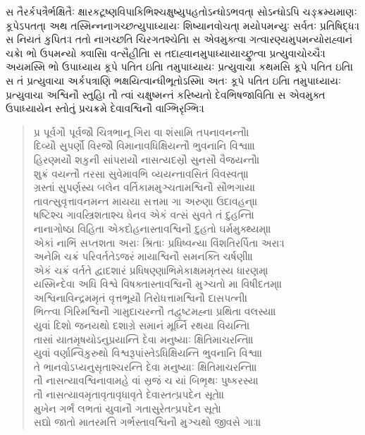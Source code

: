 \documentclass[a4paper,12pt]{article}
\begin{document}
સ તૈરર્કપત્રૈર્ભક્ષિતૈઃ ક્ષારકટૂષ્ણવિપાકિભિશ્ચક્ષુષ્યુપહતોઽન્ધોઽભવત્। સોઽન્ધોઽપિ ચઙ્ક્રમ્યમાણઃ કૂપેઽપતત્।
અથ તસ્મિન્નનાગચ્છત્યુપાધ્યાયઃ શિષ્યાનવોચત્। મયોપમન્યુઃ સર્વતઃ પ્રતિષિદ્ધઃ। સ નિયતં કુપિતઃ। તતો નાગચ્છતિ ચિરગતશ્ચેતિ।
સ એવમુક્ત્વા ગત્વારણ્યમુપમન્યોરાહ્વાનં ચક્રે। ભો ઉપમન્યો ક્વાસિ। વત્સૈહીતિ।
સ તદાહ્વાનમુપાધ્યાયાચ્છ્રુત્વા પ્રત્યુવાચોચ્ચૈઃ। અયમસ્મિ ભો ઉપાધ્યાય કૂપે પતિત ઇતિ।
તમુપાધ્યાયઃ પ્રત્યુવાચ। કથમસિ કૂપે પતિત ઇતિ।
સ તં પ્રત્યુવાચ। અર્કપત્રાણિ ભક્ષયિત્વાન્ધીભૂતોઽસ્મિ। અતઃ કૂપે પતિત ઇતિ।
તમુપાધ્યાયઃ પ્રત્યુવાચ। અશ્વિનૌ સ્તુહિ। તૌ ત્વાં ચક્ષુષ્મન્તં કરિષ્યતો દેવભિષજાવિતિ।
સ એવમુક્ત ઉપાધ્યાયેન સ્તોતું પ્રચક્રમે દેવાવશ્વિનૌ વાગ્ભિરૃગ્ભિઃ।
\begin{verse}
પ્ર પૂર્વગૌ પૂર્વજૌ ચિત્રભાનૂ ગિરા વા શંસામિ તપનાવનન્તૌ। \\
દિવ્યૌ સુપર્ણૌ વિરજૌ વિમાનાવધિક્ષિયન્તૌ ભુવનાનિ વિશ્વા॥ \\
હિરણ્મયૌ શકુની સાંપરાયૌ નાસત્યદસ્રૌ સુનસૌ વૈજયન્તૌ। \\
શુક્રં વયન્તૌ તરસા સુવેમાવભિ વ્યયન્તાવસિતં વિવસ્વત્॥ \\
ગ્રસ્તાં સુપર્ણસ્ય બલેન વર્તિકામમુઞ્ચતામશ્વિનૌ સૌભગાય। \\
તાવત્સુવૃત્તાવનમન્ત માયયા સત્તમા ગા અરુણા ઉદાવહન્॥ \\
ષષ્ટિશ્ચ ગાવસ્ત્રિશતાશ્ચ ધેનવ એકં વત્સં સુવતે તં દુહન્તિ। \\
નાનાગોષ્ઠા વિહિતા એકદોહનાસ્તાવશ્વિનૌ દુહતો ઘર્મમુક્થ્યમ્॥ \\
એકાં નાભિં સપ્તશતા અરાઃ શ્રિતાઃ પ્રધિષ્વન્યા વિંશતિરર્પિતા અરાઃ। \\
અનેમિ ચક્રં પરિવર્તતેઽજરં માયાશ્વિનૌ સમનક્તિ ચર્ષણી॥ \\
એકં ચક્રં વર્તતે દ્વાદશારં પ્રધિષણ્ણાભિમેકાક્ષમમૃતસ્ય ધારણમ્। \\
યસ્મિન્દેવા અધિ વિશ્વે વિષક્તાસ્તાવશ્વિનૌ મુઞ્ચતો મા વિષીદતમ્॥ \\
અશ્વિનાવિન્દ્રમમૃતં વૃત્તભૂયૌ તિરોધત્તામશ્વિનૌ દાસપત્ની। \\
ભિત્ત્વા ગિરિમશ્વિનૌ ગામુદાચરન્તૌ તદ્વૃષ્ટમહ્ના પ્રથિતા વલસ્ય॥ \\
યુવાં દિશો જનયથો દશાગ્રે સમાનં મૂર્ધ્નિ રથયા વિયન્તિ। \\
તાસાં યાતમૃષયોઽનુપ્રયાન્તિ દેવા મનુષ્યાઃ ક્ષિતિમાચરન્તિ॥ \\
યુવાં વર્ણાન્વિકુરુથો વિશ્વરૂપાંસ્તેઽધિક્ષિયન્તિ ભુવનાનિ વિશ્વા। \\
તે ભાનવોઽપ્યનુસૃતાશ્ચરન્તિ દેવા મનુષ્યાઃ ક્ષિતિમાચરન્તિ॥ \\
તૌ નાસત્યાવશ્વિનાવામહે વાં સ્રજં ચ યાં બિભૃથઃ પુષ્કરસ્ય। \\
તૌ નાસત્યાવમૃતાવૃતાવૃધાવૃતે દેવાસ્તત્પ્રપદેન સૂતે॥ \\
મુખેન ગર્ભં લભતાં યુવાનૌ ગતાસુરેતત્પ્રપદેન સૂતે। \\
સદ્યો જાતો માતરમત્તિ ગર્ભસ્તાવશ્વિનૌ મુઞ્ચથો જીવસે ગાઃ॥ \\
\end{verse}
\end{document}

